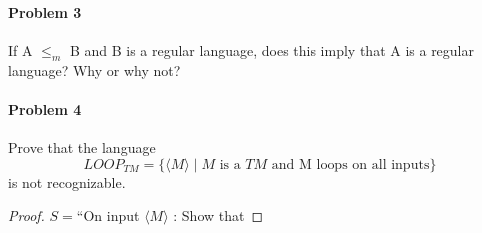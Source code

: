 \documentclass{article}
\begin{document}


\paragraph{Problem 3} If A $\leq_m$ B and B is a regular language, does this imply that A
is a regular language? Why or why not?



\paragraph{Problem 4} Prove that the language
\[LOOP_{TM} = \{ \langle M \rangle \;|\; M \mbox{ is a $TM$ and M loops on all inputs}\} \]
is not recognizable.
\begin{proof}
$S= $``On input $\langle M \rangle$ : Show that  


\end{proof}
\end{document}
